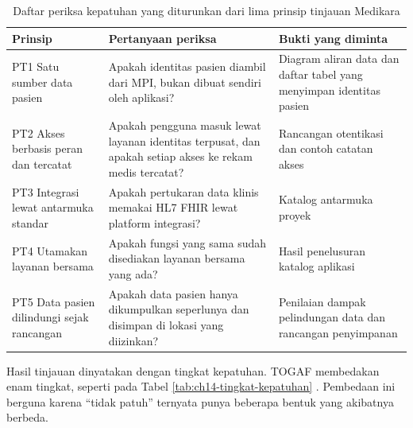 \begin{table}[!htb]
  \centering
  \caption{Daftar periksa kepatuhan yang diturunkan dari lima prinsip
           tinjauan Medikara}
  \label{tab:ch14-daftar-periksa}
  \begin{tabularx}{\textwidth}{>{\raggedright\arraybackslash}p{2.3cm}>{\raggedright\arraybackslash}X>{\raggedright\arraybackslash}X}
    \hline
    \textbf{Prinsip} & \textbf{Pertanyaan periksa} & \textbf{Bukti yang diminta} \\
    \hline
    PT1 Satu sumber data pasien & Apakah identitas pasien diambil dari MPI,
      bukan dibuat sendiri oleh aplikasi? & Diagram aliran data dan daftar
      tabel yang menyimpan identitas pasien \\
    \hline
    PT2 Akses berbasis peran dan tercatat & Apakah pengguna masuk lewat
      layanan identitas terpusat, dan apakah setiap akses ke rekam medis
      tercatat? & Rancangan otentikasi dan contoh catatan akses \\
    \hline
    PT3 Integrasi lewat antarmuka standar & Apakah pertukaran data klinis
      memakai HL7 FHIR lewat platform integrasi? & Katalog antarmuka proyek \\
    \hline
    PT4 Utamakan layanan bersama & Apakah fungsi yang sama sudah disediakan
      layanan bersama yang ada? & Hasil penelusuran katalog aplikasi \\
    \hline
    PT5 Data pasien dilindungi sejak rancangan & Apakah data pasien hanya
      dikumpulkan seperlunya dan disimpan di lokasi yang diizinkan? &
      Penilaian dampak pelindungan data dan rancangan penyimpanan \\
    \hline
  \end{tabularx}
\end{table}

Hasil tinjauan dinyatakan dengan tingkat kepatuhan. TOGAF membedakan enam
tingkat, seperti pada Tabel \ref{tab:ch14-tingkat-kepatuhan}
\cite{togaf10}. Pembedaan ini berguna karena ``tidak patuh'' ternyata punya
beberapa bentuk yang akibatnya berbeda.

